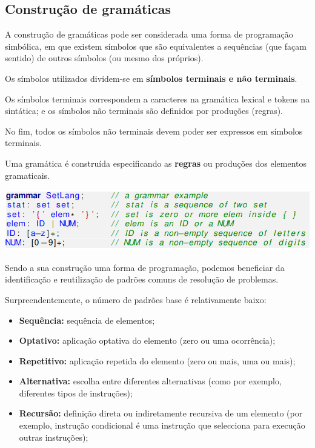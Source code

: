 \documentclass{article}
\begin{document}
\subsection{Construção de gramáticas}

\begin{flushleft}
  \item A construção de gramáticas pode ser considerada uma
  forma de programação simbólica, em que existem
  símbolos que são equivalentes a sequências (que façam
  sentido) de outros símbolos (ou mesmo dos próprios).
  \item Os símbolos utilizados dividem-se em \textbf{símbolos terminais
  e não terminais}.
  \item Os símbolos terminais correspondem a caracteres na
  gramática lexical e tokens na sintática; e os símbolos não
  terminais são definidos por produções (regras).
  \item No fim, todos os símbolos não terminais devem poder ser
  expressos em símbolos terminais.
  \item Uma gramática é construída especificando as \textbf{regras} ou
  produções dos elementos gramaticais.

  \begin{center}
    \includegraphics[scale=0.3]{33}
  \end{center}

  \item Sendo a sua construção uma forma de programação,
  podemos beneficiar da identificação e reutilização de
  padrões comuns de resolução de problemas.
  \item Surpreendentemente, o número de padrões base é
  relativamente baixo:
  \begin{itemize}
    \item \textbf{Sequência:} sequência de elementos;
    \item \textbf{Optativo:} aplicação optativa do elemento (zero ou uma
    ocorrência);
    \item \textbf{Repetitivo:} aplicação repetida do elemento (zero ou mais,
    uma ou mais);
    \item \textbf{Alternativa:} escolha entre diferentes alternativas (como por
    exemplo, diferentes tipos de instruções);
    \item \textbf{Recursão:} definição direta ou indiretamente recursiva de
    um elemento (por exemplo, instrução condicional é uma
    instrução que selecciona para execução outras instruções);
  \end{itemize}


\end{flushleft}
\end{document}
